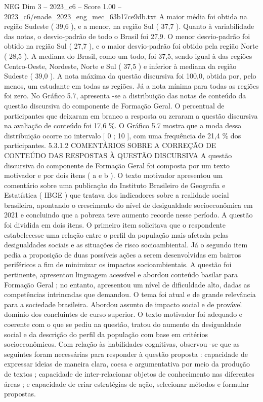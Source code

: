 \begin{textsample}{NEG Dim 3 – 2023\_c6 – Score 1.00 – 2023\_c6/enade\_2023\_eng\_mec\_63b17ce9db.txt}
A maior média foi obtida na região Sudeste ( 39,6 ), e a menor, na região Sul ( 37,7 ).
Quanto à variabilidade das notas, o desvio-padrão de todo o Brasil foi 27,9.
O menor desvio-padrão foi obtido na região Sul ( 27,7 ), e o maior desvio-padrão foi obtido pela região Norte ( 28,5 ).
A mediana do Brasil, como um todo, foi 37,5, sendo igual à das regiões Centro-Oeste, Nordeste, Norte e Sul ( 37,5 ) e inferior à mediana da região Sudeste ( 39,0 ).
A nota máxima da questão discursiva foi 100,0, obtida por, pelo menos, um estudante em todas as regiões.
Já a nota mínima para todas as regiões foi zero.
No Gráfico 5.7, apresenta -se a distribuição das notas de conteúdo da questão discursiva do componente de Formação Geral.
O percentual de participantes que deixaram em branco a resposta ou zeraram a questão discursiva na avaliação de conteúdo foi 17,6 \%.
O Gráfico 5.7 mostra que a moda dessa distribuição ocorre no intervalo [ 0 ; 10 ], com uma frequência de 21,4 \% dos participantes. 5.3.1.2 COMENTÁRIOS SOBRE A CORREÇÃO DE CONTEÚDO DAS RESPOSTAS À QUESTÃO DISCURSIVA A questão discursiva do componente de Formação Geral foi composta por um texto motivador e por dois itens ( a e b ).
O texto motivador apresentou um comentário sobre uma publicação do Instituto Brasileiro de Geografia e Estatística ( IBGE ) que tratava dos indicadores sobre a realidade social brasileira, apontando o crescimento do nível de desigualdade socioeconômica em 2021 e concluindo que a pobreza teve aumento recorde nesse período.
A questão foi dividida em dois itens.
O primeiro item solicitava que o respondente estabelecesse uma relação entre o perfil da população mais afetada pelas desigualdades sociais e as situações de risco socioambiental.
Já o segundo item pedia a proposição de duas possíveis ações a serem desenvolvidas em bairros periféricos a fim de minimizar os impactos socioambientais.
A questão foi pertinente, apresentou linguagem acessível e abordou conteúdo basilar para Formação Geral ; no entanto, apresentou um nível de dificuldade alto, dadas as competências intrincadas que demandou.
O tema foi atual e de grande relevância para a sociedade brasileira.
Abordou assunto de impacto social e de provável domínio dos concluintes de curso superior.
O texto motivador foi adequado e coerente com o que se pediu na questão, tratou do aumento da desigualdade social e da descrição do perfil da população com base em critérios socioeconômicos.
Com relação às habilidades cognitivas, observou -se que as seguintes foram necessárias para responder à questão proposta : capacidade de expressar ideias de maneira clara, coesa e argumentativa por meio da produção de textos ; capacidade de inter-relacionar objetos de conhecimento nas diferentes áreas ; e capacidade de criar estratégias de ação, selecionar métodos e formular propostas.

\end{textsample}
